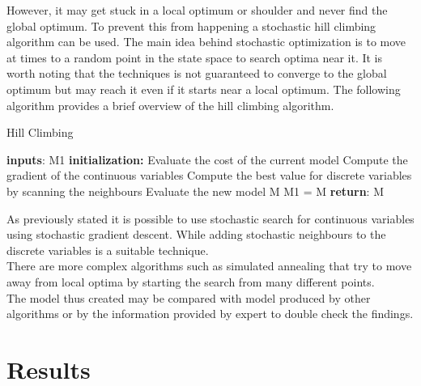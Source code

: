\documentclass{article}
\begin{document}
However, it may get stuck in a local optimum or shoulder and never find the global optimum. To prevent this from happening a stochastic hill climbing algorithm can be used. The main idea behind stochastic optimization is to move at times to a random point in the state space to search optima near it. It is worth noting that the techniques is not guaranteed to converge to the global optimum but may reach it even if it starts near a local optimum. The following algorithm provides a brief overview of the hill climbing algorithm.
\begin{algorithm} [H]
   \caption{Hill Climbing}
    \begin{algorithmic}[1]
        \State \textbf{inputs}: 
        \State M1 
            \State \textbf{initialization:}
            \Do
            \State Evaluate the cost of the current model
            \State Compute the gradient of the continuous variables
     	    \State Compute the best value for discrete variables by scanning the neighbours
     	    \State Evaluate the new model M
 				\State M1 = M
 		\EndIf
 \State \textbf{return}:  M
\end{algorithmic}
\end{algorithm}
As previously stated it is possible to use stochastic search for continuous variables using stochastic gradient descent. While adding stochastic neighbours to the discrete variables is a suitable technique. \\
There are more complex algorithms such as simulated annealing that try to move away from local optima by starting the search from many different points. \\
The model thus created may be compared with model produced by other algorithms or by the information provided by expert to double check the findings. \\


\section{Results}
\end{document}
